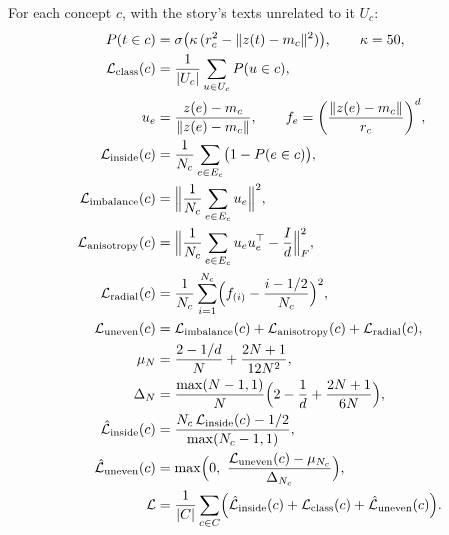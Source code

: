 \documentclass[11pt]{article}
\theoremstyle{remark}
\begin{document}
For each concept $c$, with the story's texts unrelated to it $U_c$:
\begin{align}
P(t \in c) &= \sigma\bigl(\kappa\,(r_c^2 - \|z(t) - m_c\|^2)\bigr), \qquad \kappa = 50, \label{eq:loss-membership} \\
\mathcal{L}_{\mathrm{class}}(c) &= \frac{1}{|U_c|} \sum_{u \in U_c} P(u \in c), \label{eq:loss-classification} \\
u_e &= \frac{z(e) - m_c}{\|z(e) - m_c\|}, \qquad f_e = \biggl(\frac{\|z(e) - m_c\|}{r_c}\biggr)^{d}, \label{eq:loss-direction} \\
\mathcal{L}_{\mathrm{inside}}(c) &= \frac{1}{N_c} \sum_{e \in E_c} \bigl(1 - P(e \in c)\bigr), \label{eq:loss-inside} \\
\mathcal{L}_{\mathrm{imbalance}}(c) &= \Bigl\|\frac{1}{N_c} \sum_{e \in E_c} u_e\Bigr\|^2, \label{eq:loss-imbalance} \\
\mathcal{L}_{\mathrm{anisotropy}}(c) &= \Bigl\|\frac{1}{N_c} \sum_{e \in E_c} u_e u_e^{\top} - \frac{I}{d}\Bigr\|_F^2, \label{eq:loss-anisotropy} \\
\mathcal{L}_{\mathrm{radial}}(c) &= \frac{1}{N_c} \sum_{i=1}^{N_c} \Bigl(f_{(i)} - \frac{i - 1/2}{N_c}\Bigr)^2, \label{eq:loss-radial} \\
\mathcal{L}_{\mathrm{uneven}}(c) &= \mathcal{L}_{\mathrm{imbalance}}(c) + \mathcal{L}_{\mathrm{anisotropy}}(c) + \mathcal{L}_{\mathrm{radial}}(c), \label{eq:loss-uneven} \\
\mu_{N} &= \frac{2 - 1/d}{N} + \frac{2N + 1}{12N^2}, \label{eq:loss-uniform-mean} \\
\Delta_{N} &= \frac{\max(N - 1, 1)}{N} \Bigl(2 - \frac{1}{d} + \frac{2N + 1}{6N}\Bigr), \label{eq:loss-uneven-range} \\
\hat{\mathcal{L}}_{\mathrm{inside}}(c) &= \frac{N_c\,\mathcal{L}_{\mathrm{inside}}(c) - 1/2}{\max(N_c - 1, 1)}, \label{eq:loss-inside-scaled} \\
\hat{\mathcal{L}}_{\mathrm{uneven}}(c) &= \max\Bigl(0,\ \frac{\mathcal{L}_{\mathrm{uneven}}(c) - \mu_{N_c}}{\Delta_{N_c}}\Bigr), \label{eq:loss-uneven-scaled} \\
\mathcal{L} &= \frac{1}{|C|} \sum_{c \in C} \Bigl(\hat{\mathcal{L}}_{\mathrm{inside}}(c) + \mathcal{L}_{\mathrm{class}}(c) + \hat{\mathcal{L}}_{\mathrm{uneven}}(c)\Bigr). \label{eq:loss}
\end{align}
\end{document}

